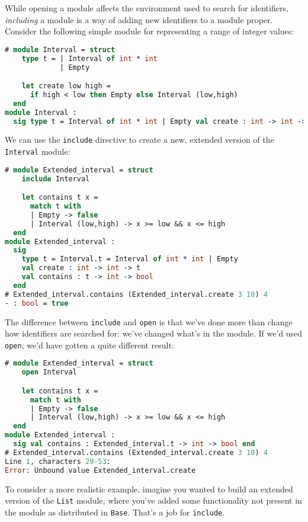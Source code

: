 While opening a module affects the environment used to search for
identifiers, \emph{including} a module is a way of adding new
identifiers to a module proper. Consider the following simple module for
representing a range of integer values:

\begin{lstlisting}[language=Caml]
# module Interval = struct
    type t = | Interval of int * int
             | Empty

    let create low high =
      if high < low then Empty else Interval (low,high)
  end
module Interval :
  sig type t = Interval of int * int | Empty val create : int -> int -> t end
\end{lstlisting}

We can use the \passthrough{\lstinline!include!} directive to create a
new, extended version of the \passthrough{\lstinline!Interval!} module:

\begin{lstlisting}[language=Caml]
# module Extended_interval = struct
    include Interval

    let contains t x =
      match t with
      | Empty -> false
      | Interval (low,high) -> x >= low && x <= high
  end
module Extended_interval :
  sig
    type t = Interval.t = Interval of int * int | Empty
    val create : int -> int -> t
    val contains : t -> int -> bool
  end
# Extended_interval.contains (Extended_interval.create 3 10) 4
- : bool = true
\end{lstlisting}

The difference between \passthrough{\lstinline!include!} and
\passthrough{\lstinline!open!} is that we've done more than change how
identifiers are searched for: we've changed what's in the module. If
we'd used \passthrough{\lstinline!open!}, we'd have gotten a quite
different result:

\begin{lstlisting}[language=Caml]
# module Extended_interval = struct
    open Interval

    let contains t x =
      match t with
      | Empty -> false
      | Interval (low,high) -> x >= low && x <= high
  end
module Extended_interval :
  sig val contains : Extended_interval.t -> int -> bool end
# Extended_interval.contains (Extended_interval.create 3 10) 4
Line 1, characters 29-53:
Error: Unbound value Extended_interval.create
\end{lstlisting}

To consider a more realistic example, imagine you wanted to build an
extended version of the \passthrough{\lstinline!List!} module, where
you've added some functionality not present in the module as distributed
in \passthrough{\lstinline!Base!}. That's a job for
\passthrough{\lstinline!include!}.

